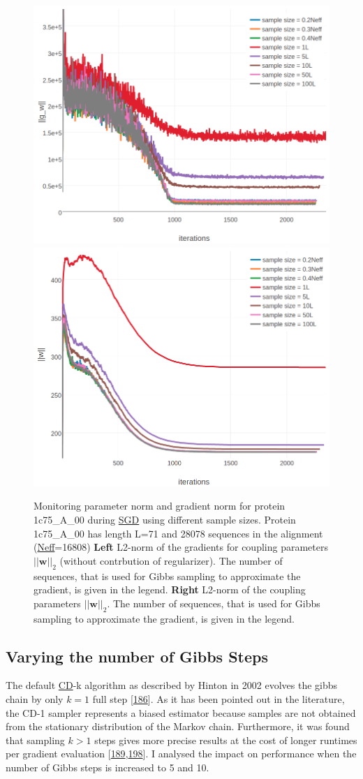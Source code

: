 \documentclass[11pt,a4paper,twoside]{book}
\newcommand{\eq}{\!=\!}
\newcommand{\w}{\mathbf{w}}
\theoremstyle{definition}
\theoremstyle{definition}
\theoremstyle{remark}
\begin{document}
\begin{figure}

{\centering \includegraphics[width=0.48\linewidth]{img/full_likelihood/gibbs_sampling/1c75A00_gradient_norm_for_samplesizes} \includegraphics[width=0.48\linewidth]{img/full_likelihood/gibbs_sampling/1c75A00_parameter_norm_for_samplesizes} 

}

\caption{Monitoring parameter norm and
gradient norm for protein 1c75\_A\_00 during
\protect\hyperlink{abbrev}{SGD} using different sample sizes. Protein
1c75\_A\_00 has length L=71 and 28078 sequences in the alignment
(\protect\hyperlink{abbrev}{Neff}=16808) \textbf{Left} L2-norm of the
gradients for coupling parameters \(||\w||_2\) (without contrbution of
regularizer). The number of sequences, that is used for Gibbs sampling
to approximate the gradient, is given in the legend. \textbf{Right}
L2-norm of the coupling parameters \(||\w||_2\). The number of
sequences, that is used for Gibbs sampling to approximate the gradient,
is given in the legend.}\label{fig:cd-samplesize-protein1c75a00}
\end{figure}

\subsection{Varying the number of Gibbs Steps}\label{cd-gibbs-steps}

The default \protect\hyperlink{abbrev}{CD}-k algorithm as described by
Hinton in 2002 evolves the gibbs chain by only \(k \eq 1\) full step
{[}\protect\hyperlink{ref-Hinton2002}{186}{]}. As it has been pointed
out in the literature, the CD-1 sampler represents a biased estimator
because samples are not obtained from the stationary distribution of the
Markov chain. Furthermore, it was found that sampling \(k>1\) steps
gives more precise results at the cost of longer runtimes per gradient
evaluation
{[}\protect\hyperlink{ref-Bengio2009}{189},\protect\hyperlink{ref-Tieleman2008}{198}{]}.
I analysed the impact on performance when the number of Gibbs steps is
increased to 5 and 10.
\end{document}
